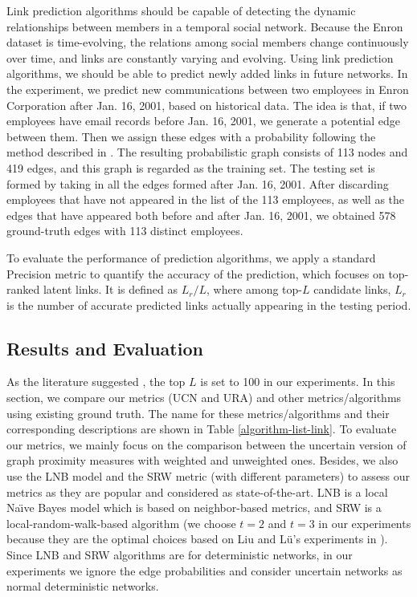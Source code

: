 \documentclass[\main/thesis.tex]{subfiles}
\begin{document}
Link prediction algorithms should be capable of detecting the dynamic relationships between members in a temporal social network. Because the Enron dataset is time-evolving, the relations among social members change continuously over time, and links are constantly varying and evolving. Using link prediction algorithms, we should be able to predict newly added links in future networks. In the experiment, we predict new communications between two employees in Enron Corporation after Jan. 16, 2001, based on historical data. The idea is that, if two employees have email records before Jan. 16, 2001, we generate a potential edge between them. Then we assign these edges with a probability following the method described in  \cite{shetty2004enron}. The resulting probabilistic graph consists of 113 nodes and 419 edges, and this graph is regarded as the training set. The testing set is formed by taking in all the edges formed after Jan. 16, 2001. After discarding employees that have not appeared in the list of the 113 employees, as well as the edges that have appeared both before and after Jan. 16, 2001, we obtained 578 ground-truth edges with 113 distinct employees.

To evaluate the performance of prediction algorithms, we apply a standard Precision metric to quantify the accuracy of the prediction, which focuses on top-ranked latent links. It is defined as $L_r/L$, where among top-$L$ candidate links, $L_r$ is the number of accurate predicted links actually appearing in the testing period.


\subsection{Results and Evaluation}
As the literature suggested \cite{lu2010link,lu2011link,liu2011link,tan2014link,zhu2016link}, the top $L$ is set to 100 in our experiments. In this section, we compare our metrics (UCN and URA) and other metrics/algorithms using existing ground truth. The name for these metrics/algorithms and their corresponding descriptions are shown in Table \ref{algorithm-list-link}. To evaluate our metrics, we mainly focus on the comparison between the uncertain version of graph proximity measures with weighted and unweighted ones. Besides, we also use the LNB model and the SRW metric (with different parameters) to assess our metrics as they are popular and considered as state-of-the-art. LNB is a local Na{\"\i}ve Bayes model which is based on neighbor-based metrics, and SRW is a local-random-walk-based algorithm (we choose $t=2$ and $t=3$ in our experiments because they are the optimal choices based on Liu and L{\"u}'s experiments in \cite{liu2010link}). Since LNB and SRW algorithms are for deterministic networks, in our experiments we ignore the edge probabilities and consider uncertain networks as normal deterministic networks.
\end{document}
